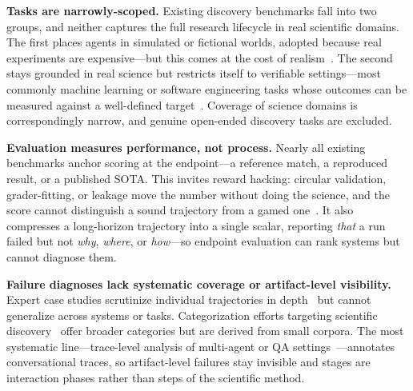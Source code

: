 \textbf{Tasks are narrowly-scoped.} Existing discovery benchmarks fall into
two groups, and neither captures the full research lifecycle in real scientific
domains. The first places agents in simulated or fictional worlds, adopted
because real experiments are expensive---but this comes at the cost of
realism~\citep{jansen2024discoveryworldvirtualenvironmentdeveloping,
wang2022scienceworldagentsmarter5th, majumder2024discoverybenchdatadrivendiscoverylarge,
li2026pdagentbenchcharacterizinggroundingarchitecting}. The second stays
grounded in real science but restricts itself to verifiable settings---most
commonly machine learning or software engineering tasks whose outcomes can be
measured against a well-defined target~\citep{chan2025mle, nathani2025mlgym,
starace2025paperbench, chen2025scienceagentbenchrigorousassessmentlanguage,
tian2024scicode, wang2026naturebench, xu2026researchclawbench}. Coverage of
science domains is correspondingly narrow, and genuine open-ended discovery
tasks are excluded.

\textbf{Evaluation measures performance, not process.} Nearly all existing
benchmarks anchor scoring at the endpoint---a reference match, a reproduced
result, or a published SOTA. This invites reward hacking: circular validation,
grader-fitting, or leakage move the number without doing the science, and the
score cannot distinguish a sound trajectory from a gamed
one~\citep{chan2025mle, hu2025repro, wang2026naturebench}. It also compresses a
long-horizon trajectory into a single scalar, reporting \emph{that} a run
failed but not \emph{why}, \emph{where}, or \emph{how}---so endpoint
evaluation can rank systems but cannot diagnose them.

\textbf{Failure diagnoses lack systematic coverage or artifact-level
visibility.} Expert case studies scrutinize individual trajectories in
depth~\citep{kirgis2026shadow, li2026scicomp, rawat2026plausible,
horstmann2026neuro, eulig2026cawm, trehan2026llmsarentscientistsyet,
zhang2026far} but cannot generalize across systems or tasks.
Categorization efforts targeting scientific
discovery~\citep{luo2025automateseehiddenpitfalls,
eulig2026cawm, bisht2026agenticaiscientistsbuilt} offer
broader categories but are derived from small corpora. The most systematic
line---trace-level analysis of multi-agent or QA
settings~\citep{cemri2026multi, deshpande2025trailtracereasoningagentic, zhang2025agent}---annotates
conversational traces, so artifact-level failures stay invisible and stages are
interaction phases rather than steps of the scientific method.

